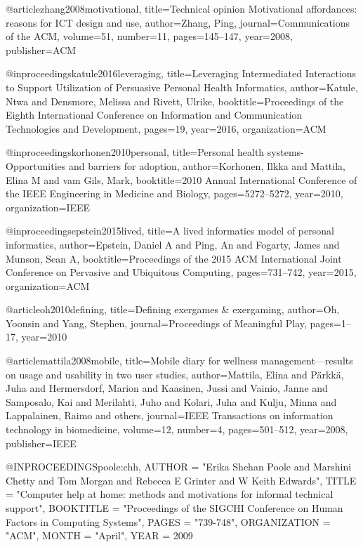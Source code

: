 @article{zhang2008motivational,
  title={Technical opinion Motivational affordances: reasons for ICT design and use},
  author={Zhang, Ping},
  journal={Communications of the ACM},
  volume={51},
  number={11},
  pages={145--147},
  year={2008},
  publisher={ACM}
}

@inproceedings{katule2016leveraging,
  title={Leveraging Intermediated Interactions to Support Utilization of Persuasive Personal Health Informatics},
  author={Katule, Ntwa and Densmore, Melissa and Rivett, Ulrike},
  booktitle={Proceedings of the Eighth International Conference on Information and Communication Technologies and Development},
  pages={19},
  year={2016},
  organization={ACM}
}

@inproceedings{korhonen2010personal,
  title={Personal health systems-Opportunities and barriers for adoption},
  author={Korhonen, Ilkka and Mattila, Elina M and vam Gils, Mark},
  booktitle={2010 Annual International Conference of the IEEE Engineering in Medicine and Biology},
  pages={5272--5272},
  year={2010},
  organization={IEEE}
}

@inproceedings{epstein2015lived,
  title={A lived informatics model of personal informatics},
  author={Epstein, Daniel A and Ping, An and Fogarty, James and Munson, Sean A},
  booktitle={Proceedings of the 2015 ACM International Joint Conference on Pervasive and Ubiquitous Computing},
  pages={731--742},
  year={2015},
  organization={ACM}
}

@article{oh2010defining,
  title={Defining exergames \& exergaming},
  author={Oh, Yoonsin and Yang, Stephen},
  journal={Proceedings of Meaningful Play},
  pages={1--17},
  year={2010}
}

@article{mattila2008mobile,
  title={Mobile diary for wellness management—results on usage and usability in two user studies},
  author={Mattila, Elina and P{\"a}rkk{\"a}, Juha and Hermersdorf, Marion and Kaasinen, Jussi and Vainio, Janne and Samposalo, Kai and Merilahti, Juho and Kolari, Juha and Kulju, Minna and Lappalainen, Raimo and others},
  journal={IEEE Transactions on information technology in biomedicine},
  volume={12},
  number={4},
  pages={501--512},
  year={2008},
  publisher={IEEE}
}

@INPROCEEDINGS{poole:chh,
	AUTHOR = "Erika Shehan Poole and Marshini Chetty and Tom Morgan and Rebecca E Grinter and W Keith Edwards",
	TITLE = "Computer help at home: methods and motivations for informal technical support",
	BOOKTITLE = "Proceedings of the SIGCHI Conference on Human Factors in Computing Systems",
	PAGES = "739-748",
	ORGANIZATION = "ACM",
	MONTH = "April", 
	YEAR = {2009}	}

